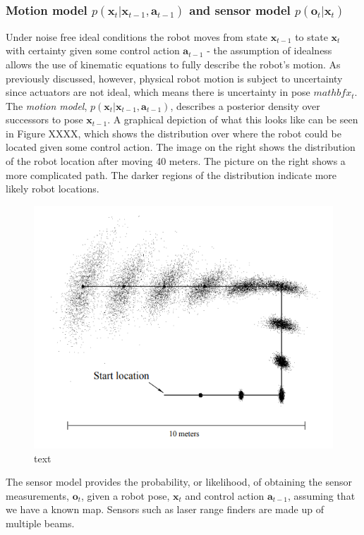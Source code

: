 \documentclass[a4paper]{article}
\begin{document}
\subsubsection{Motion model $p(\mathbf{x}_t| \mathbf{x}_{t-1}, \mathbf{a}_{t-1})$ and sensor model $p(\mathbf{o}_t|\mathbf{x}_t)$}
Under noise free ideal conditions the robot moves from state $\mathbf{x}_{t-1}$ to state $\mathbf{x}_t$ with certainty given some control action $\mathbf{a}_{t-1}$ - the assumption of idealness allows the use of kinematic equations to fully describe the robot's motion. As previously discussed, however, physical robot motion is subject to uncertainty since actuators are not ideal, which means there is uncertainty in pose $mathbf{x}_{t}$. The \textit{motion model}, $p(\mathbf{x}_t| \mathbf{x}_{t-1}, \mathbf{a}_{t-1})$, describes a posterior density over successors to pose $\mathbf{x}_{t-1}$. A graphical depiction of what this looks like can be seen in Figure XXXX, which shows the distribution over where the robot could be located given some control action. The image on the right shows the distribution of the robot location after moving 40 meters. The picture on the right shows a more complicated path. The darker regions of the distribution indicate more likely robot locations. 

\begin{figure}[h]
\centering
\includegraphics[scale=0.4]{motion_model}
\caption{text}
\end{figure}

The sensor model provides the probability, or likelihood, of obtaining the sensor measurements, $\mathbf{o}_t$, given a robot pose, $\mathbf{x}_t$ and control action $\mathbf{a}_{t-1}$, assuming that we have a known map. Sensors such as laser range finders are made up of multiple beams.
\end{document}
